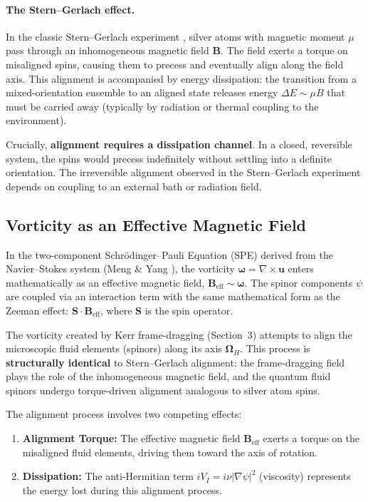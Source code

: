 \documentclass[11pt]{article}
\begin{document}
\paragraph{The Stern--Gerlach effect.}
In the classic Stern--Gerlach experiment \cite{SternGerlach1924}, silver atoms with 
magnetic moment $\mu$ pass through an inhomogeneous magnetic field $\mathbf{B}$. The 
field exerts a torque on misaligned spins, causing them to precess and eventually align 
along the field axis. This alignment is accompanied by energy dissipation: the transition 
from a mixed-orientation ensemble to an aligned state releases energy $\Delta E \sim \mu B$ 
that must be carried away (typically by radiation or thermal coupling to the environment).

Crucially, \textbf{alignment requires a dissipation channel}. In a closed, reversible 
system, the spins would precess indefinitely without settling into a definite orientation. 
The irreversible alignment observed in the Stern--Gerlach experiment depends on coupling 
to an external bath or radiation field.

\subsection{Vorticity as an Effective Magnetic Field}

In the two-component Schr\"odinger--Pauli Equation (SPE) derived from the Navier--Stokes 
system (Meng \& Yang \cite{MengYang2024}), the vorticity $\mathbf{\omega} = \nabla \times 
\mathbf{u}$ enters mathematically as an effective magnetic field, $\mathbf{B}_{\text{eff}} 
\sim \mathbf{\omega}$. The spinor components $\psi$ are coupled via an interaction term 
with the same mathematical form as the Zeeman effect: $\mathbf{S} \cdot \mathbf{B}_{\text{eff}}$, 
where $\mathbf{S}$ is the spin operator.

The vorticity created by Kerr frame-dragging (Section~3) attempts to align the microscopic 
fluid elements (spinors) along its axis $\mathbf{\Omega}_H$. This process is 
\textbf{structurally identical} to Stern--Gerlach alignment: the frame-dragging field 
plays the role of the inhomogeneous magnetic field, and the quantum fluid spinors undergo 
torque-driven alignment analogous to silver atom spins.

The alignment process involves two competing effects:

\begin{enumerate}
\item \textbf{Alignment Torque:} The effective magnetic field $\mathbf{B}_{\text{eff}}$ 
exerts a torque on the misaligned fluid elements, driving them toward the axis of rotation.

\item \textbf{Dissipation:} The anti-Hermitian term $iV_I = i\nu|\nabla\psi|^2$ (viscosity) 
represents the energy lost during this alignment process.
\end{enumerate}
\end{document}
